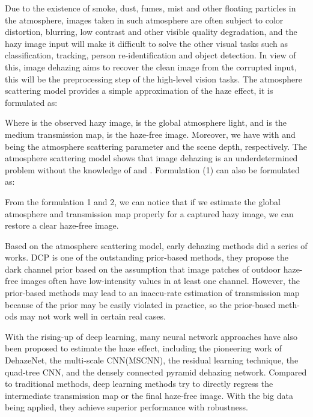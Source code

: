 \documentclass[letterpaper]{article} \usepackage{aaai20}  \usepackage{times}  \usepackage{helvet} \usepackage{courier}  \usepackage[hyphens]{url}  \usepackage{graphicx} \urlstyle{rm} \def\UrlFont{\rm}  \usepackage{graphicx}  \frenchspacing  \setlength{\pdfpagewidth}{8.5in}  \setlength{\pdfpageheight}{11in}  \usepackage{bm}
\begin{document}
Due to the existence of smoke, dust, fumes, mist and other floating particles in the atmosphere,
images taken in such atmosphere are often subject to  color distortion, blurring, low contrast and other visible quality degradation, and the hazy image input will make it difficult to solve the other visual tasks such as classification, tracking, person re-identification  and  object detection.
In view of this, image dehazing  aims to recover the clean image from the corrupted input, this will be the preprocessing step of the high-level vision tasks. The atmosphere scattering model \cite{scatteringmodel17}\cite{scatteringmodel20}\cite{scatteringmodel21} provides a simple approximation of the haze effect, it is formulated as: 


Where  is the observed hazy image,  is the global atmosphere light, and  is the medium transmission map,
 is the haze-free image. Moreover, we have with  and  being the atmosphere scattering parameter and the scene depth, respectively. The atmosphere scattering model shows that image dehazing is an underdetermined problem without the knowledge of  and .
	Formulation (1) can also be formulated as:

From the formulation 1 and 2, we can notice that if we estimate the global atmosphere and transmission map properly for a captured hazy image, we can restore a clear haze-free image.

Based on the atmosphere scattering model, early dehazing methods did a series of works\cite{featureforward6}\cite{featureforward10}\cite{featureforward11}\cite{featureforward15}\cite{featureforward17}\cite{featureforward23}\cite{featureforward34}.  DCP is one of the outstanding prior-based methods, they propose  the dark channel prior based on the assumption that image patches of outdoor haze-free images often have low-intensity values in at least one channel. However, the prior-based methods may lead to an inaccu-rate estimation of transmission map because of the prior may be easily violated in practice, so the prior-based meth-ods may not work well in certain real cases.

With the rising-up of deep learning, many neural network approaches have also been proposed to estimate the haze effect, including the pioneering work of DehazeNet\cite{dehazenet}, the multi-scale CNN(MSCNN)\cite{mscnn}, the residual learning technique\cite{resnet}, the quad-tree CNN\cite{quad_treeCNN-adaptive}, and the densely connected pyramid dehazing network\cite{dense_pyramid}. Compared to traditional  methods, deep learning methods try to directly regress the intermediate transmission map or the final haze-free image. With the big data being applied, they achieve  superior performance with robustness.
\end{document}
